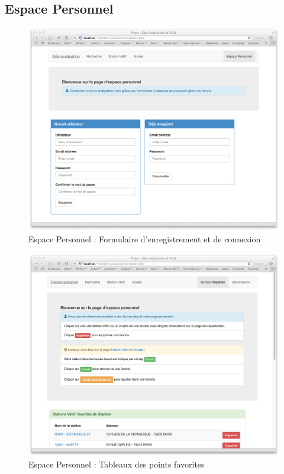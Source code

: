 \documentclass[a4paper]{article}
\begin{document}
\subsection{Espace Personnel}
\begin{figure}[!h]
\centering
\includegraphics[scale=0.3,keepaspectratio=TRUE]{connexion_2}
\caption{Espace Personnel : Formulaire d'enregistrement et de connexion}
\end{figure}
\begin{figure}[!h]
\centering
\includegraphics[scale=0.3,keepaspectratio=TRUE]{connexion_1}
\caption{Espace Personnel : Tableaux des points favorites}
\end{figure}
\end{document}
